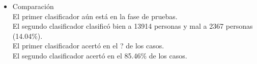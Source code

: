 \documentclass{article}
\begin{document}
\begin{itemize}
  \item Comparación\\
  El primer clasificador aún está en la fase de pruebas.\\
  El segundo clasificador clasificó bien a 13914 personas y mal a 2367 personas (14.04\%).\\
  El primer clasificador acertó en el ? de los casos.\\
  El segundo clasificador acertó en el 85.46\% de los casos.\\
 \end{itemize}
 
\end{document}
